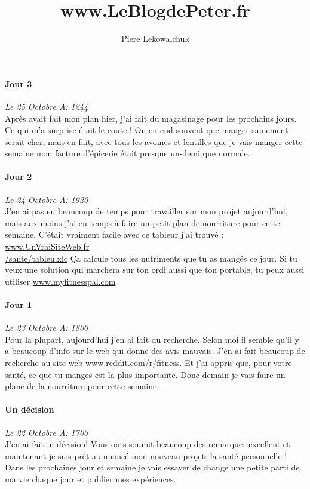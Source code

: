 \documentclass{article}
\begin{document}
\title{www.LeBlogdePeter.fr}
\author{Piere Lekowalchuk}
\date{}
     \maketitle

\paragraph{Jour 3} \emph{Le 25 Octobre A: 1244}\\
Après avait fait mon plan hier, j'ai fait du magasinage pour les prochains jours. Ce qui m'a surprise était le coute ! On entend souvent que manger sainement serait cher, mais en fait, avec tous les avoines et lentilles que je vais manger cette semaine mon facture d'épicerie était presque un-demi que normale.

\paragraph{Jour 2} \emph{Le 24 Octobre A: 1920}\\
J'en ai pas eu beaucoup de temps pour travailler sur mon projet aujourd'hui, mais aux moins j'ai eu temps à faire un petit plan de nourriture
pour cette semaine. C'était vraiment facile avec ce tableur j'ai trouvé : {\color{blue}\underline{www.UnVraiSiteWeb.fr}}\\ {\color{blue}\underline{/sante/tableu.xlc}}  Ça calcule tous les nutriments que tu as mangés ce jour. Si tu veux une solution qui marchera sur ton ordi aussi que ton portable, tu peux aussi utiliser {\color{blue}\underline{www.myfitnesspal.com}}

\paragraph{Jour 1} \emph{Le 23 Octobre A: 1800}\\
Pour la plupart, aujourd'hui j'en ai fait du recherche. Selon moi il semble qu'il y a beaucoup d'info sur le web qui donne des avis mauvais. J'en ai fait beaucoup de recherche au site web {\color{blue}\underline{www.reddit.com/r/fitness}}. Et j'ai appris que, pour votre santé, ce que tu manges est la plus importante. Donc demain je vais faire un plane de la nourriture pour cette semaine.

\paragraph{Un décision} \emph{Le 22 Octobre A: 1703}\\
J'en ai fait in décision! Vous onts soumit beaucoup des remarques excellent et maintenant je suis prêt a annoncé mon nouveau projet: la santé personnelle ! Dans les prochaines jour et semaine je vais essayer de change une petite parti de ma vie chaque jour et publier mes expériences.
\end{document}
